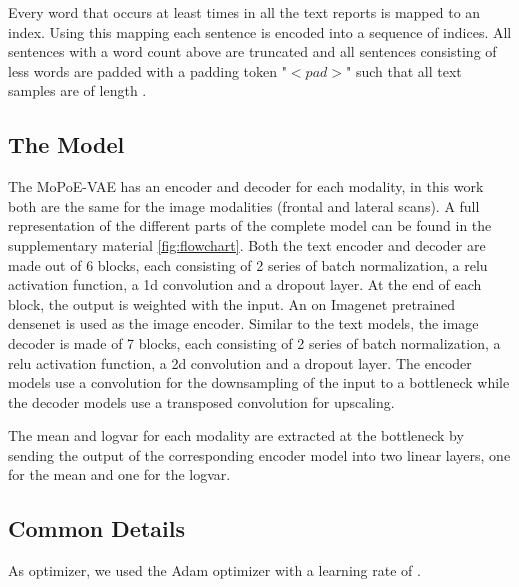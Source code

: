 Every word that occurs at least \minwordocc times in all the text reports is mapped to an index.
Using this mapping each sentence is encoded into a sequence of indices.
All sentences with a word count above \sentlen are truncated and all sentences consisting of less words are padded with a padding token "$<pad>$" such that all text samples are of length \sentlen.

\subsection{The Model}
The MoPoE-VAE has an encoder and decoder for each modality, in this work both are the same for the image modalities (frontal and lateral scans).
A full representation of the different parts of the complete model can be found in the supplementary material \cref{fig:flowchart}.
Both the text encoder and decoder are made out of 6 blocks, each consisting of 2 series of batch normalization, a relu activation function, a 1d convolution and a dropout layer.
At the end of each block, the output is weighted with the input.
An on Imagenet \cite{imagenet_cvpr09} pretrained densenet \cite{huang2018densely} is used as the image encoder.
Similar to the text models, the image decoder is made of 7 blocks, each consisting of 2 series of batch normalization, a relu activation function, a 2d convolution and a dropout layer.
The encoder models use a convolution for the downsampling of the input to a bottleneck while the decoder models use a transposed convolution for upscaling.

The mean and logvar for each modality are extracted at the bottleneck by sending the output of the corresponding encoder model into two linear layers, one for the mean and one for the logvar.

\subsection{Common Details}
As optimizer, we used the Adam optimizer \cite{adam} with a learning rate of \learningrate.